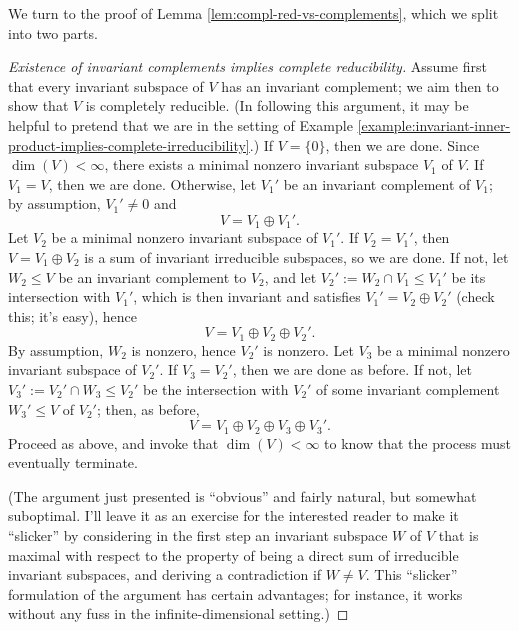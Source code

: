\documentclass[reqno]{amsart} 
\begin{document}
We turn to the proof of Lemma \ref{lem:compl-red-vs-complements}, which we split into two parts.
\begin{proof}
[Existence of invariant complements implies complete reducibility]
  Assume first that every invariant subspace of $V$ has an
  invariant complement;
  we aim then to show that $V$ is completely reducible.
  (In following this argument,
  it may be helpful to pretend
  that
  we are in the setting
  of Example \ref{example:invariant-inner-product-implies-complete-irreducibility}.)
  If $V = \{0\}$, then we are done.
  Since $\dim(V) < \infty$,
  there exists a minimal nonzero invariant subspace $V_1$ of
  $V$.
  If $V_1 = V$, then we are done.
  Otherwise, let $V_1'$ be an invariant complement of $V_1$;
  by  assumption, $V_1' \neq 0$
  and 
\begin{equation*}
V = V_1 \oplus V_1'.
\end{equation*}
  Let $V_2$ be a minimal nonzero invariant subspace
  of $V_1'$.
  If $V_2 = V_1'$, then $V = V_1 \oplus V_2$
  is a sum of invariant irreducible subspaces,
  so we are done.
  If not, let $W_2 \leq V$ be an invariant complement to $V_2$,
  and let $V_2' := W_2 \cap V_1 \leq V_1'$ be its intersection
  with $V_1'$, which is then invariant
  and satisfies $V_1' = V_2 \oplus V_2'$ (check this; it's easy),
  hence 
\begin{equation*}
V = V_1 \oplus V_2 \oplus V_2'.
\end{equation*}
  By assumption, $W_2$ is nonzero, hence $V_2'$ is nonzero.
  Let $V_3$ be a minimal nonzero invariant subspace of $V_2'$.
  If $V_3 = V_2'$, then we are done as before.
  If not, let $V_3' := V_2' \cap W_3 \leq V_2'$ be the intersection
  with $V_2'$ of some invariant complement $W_3' \leq V$ of $V_2'$; then, as before,
  \begin{equation*}
    V = V_1 \oplus V_2 \oplus V_3 \oplus V_3'.
  \end{equation*}
  Proceed as above, and invoke that $\dim(V) < \infty$
  to know that the process must eventually terminate.

  (The argument just presented is ``obvious''
  and fairly natural,
  but somewhat suboptimal.
  I'll leave it as an exercise for the interested reader
  to make it ``slicker''
  by considering in the first step an invariant subspace
  $W$ of $V$ that is maximal with respect
  to the property of being a direct sum of irreducible invariant
  subspaces,
  and deriving a contradiction if $W \neq V$.
  This ``slicker'' formulation of the argument has certain
  advantages;
  for instance, it works without any fuss in the
  infinite-dimensional setting.)
\end{proof}
\end{document}
